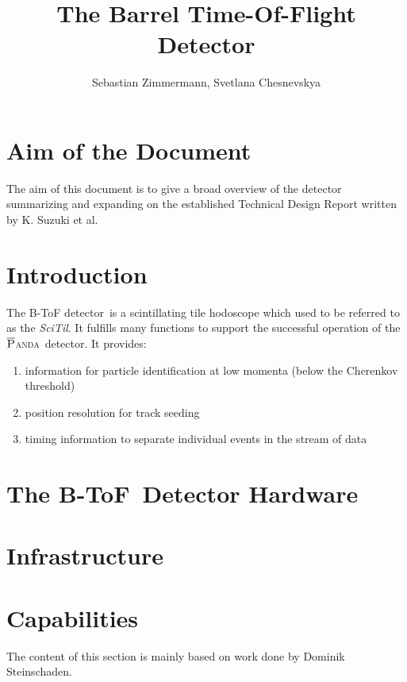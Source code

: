 \documentclass[12pt,a4paper,oneside]{article}
\author{Sebastian Zimmermann, Svetlana Chesnevskya}
\title{The Barrel Time-Of-Flight Detector}
\newcommand{\panda}{\textsc{$\overline{\textsc{P}}$anda}}
\newcommand{\btof}{B-ToF}
\newcommand{\btofD}{B-ToF detector}
\begin{document}
\maketitle

\section*{Aim of the Document}
The aim of this document is to give a broad overview of the detector summarizing and expanding on the established Technical Design Report written by K. Suzuki et al.

\tableofcontents
\newpage

\section{Introduction}

The \btofD\ is a scintillating tile hodoscope which used to be referred to as the \emph{SciTil}. It fulfills many functions to support the successful operation of the \panda\ detector. It provides:
\begin{enumerate}[I]
	\item	information for particle identification at low momenta (below the Cherenkov threshold)
	\item	position resolution for track seeding
	\item	timing information to separate individual events in the stream of data
\end{enumerate}


\section{The \btof\ Detector Hardware}


\section{Infrastructure}


\section{Capabilities}

The content of this section is mainly based on work done by Dominik Steinschaden. 
\end{document}
